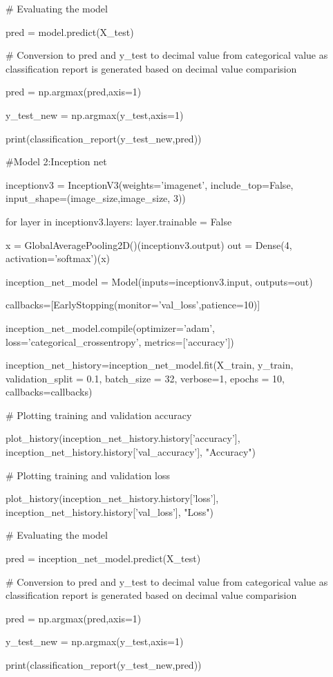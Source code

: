 \documentclass[12pt, a4paper,twoside]{report}
\theoremstyle{plain} %
\theoremstyle{definition} %
\theoremstyle{remark} %
\numberwithin{equation}{chapter}
\begin{document}
\# Evaluating the model

pred = model.predict(X\_test)

# Conversion to pred and y\_test to decimal value from categorical value as classification report is generated based on decimal value comparision

pred = np.argmax(pred,axis=1)

y\_test\_new = np.argmax(y\_test,axis=1)

print(classification\_report(y\_test\_new,pred))

\#Model 2:Inception net

inceptionv3 = InceptionV3(weights='imagenet', include\_top=False, input\_shape=(image\_size,image\_size, 3))

for layer in inceptionv3.layers:
    layer.trainable = False

x = GlobalAveragePooling2D()(inceptionv3.output)
out = Dense(4, activation='softmax')(x)

inception\_net\_model = Model(inputs=inceptionv3.input, outputs=out)

callbacks=[EarlyStopping(monitor='val\_loss',patience=10)]

inception\_net\_model.compile(optimizer='adam', loss='categorical\_crossentropy', metrics=['accuracy'])

inception\_net\_history=inception\_net\_model.fit(X\_train, y\_train, validation\_split = 0.1, batch\_size = 32, verbose=1, epochs = 10, callbacks=callbacks)

\# Plotting training and validation accuracy

plot\_history(inception\_net\_history.history['accuracy'], inception\_net\_history.history['val\_accuracy'], "Accuracy")

\# Plotting training and validation loss

plot\_history(inception\_net\_history.history['loss'], inception\_net\_history.history['val\_loss'], "Loss")

\# Evaluating the model

pred = inception\_net\_model.predict(X\_test)

\# Conversion to pred and y\_test to decimal value from categorical value as classification report is generated based on decimal value comparision

pred = np.argmax(pred,axis=1)

y\_test\_new = np.argmax(y\_test,axis=1)

print(classification\_report(y\_test\_new,pred))




\end{document}
